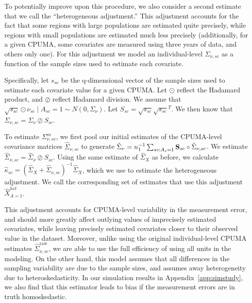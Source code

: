 To potentially improve upon this procedure, we also consider a second estimate that we call the ``heterogeneous adjustment.'' This adjustment accounts for the fact that some regions with large populations are estimated quite precisely, while regions with small populations are estimated much less precisely (additionally, for a given CPUMA, some covariates are measured using three years of data, and others only one). For this adjustment we model an individual-level $\Sigma_{\nu, sc}$ as a function of the sample sizes used to estimate each covariate. 

Specifically, let $s_{sc}$ be the q-dimensional vector of the sample sizes used to estimate each covariate value for a given CPUMA. Let $\odot$ reflect the Hadamard product, and $\oslash$ reflect Hadamard division. We assume that $\sqrt{s_{sc}} \odot \nu_{sc} \mid A_{sc} = 1 \sim N(0, \Sigma_{\nu})$. Let $S_{sc} = \sqrt{s_{sc}}\sqrt{s_{sc}}^T$. We then know that $\Sigma_{\nu, sc} = \Sigma_{\nu} \oslash S_{sc}$.

To estimate $\Sigma_{\nu, sc}^m$, we first pool our initial estimates of the CPUMA-level covariance matrices $\hat{\Sigma}_{\nu, sc}$ to generate $\hat{\Sigma}_{\nu} = n_1^{-1}\sum_{sc: A_s = 1} \mathbf{S}_{sc} \circ \hat{\Sigma}_{\nu, sc}$. We estimate $\hat{\Sigma}_{\nu, sc} = \hat{\Sigma}_{\nu} \oslash S_{sc}$. Using the same estimate of $\hat{\Sigma}_X$ as before, we calculate $\hat{\kappa}_{sc} = (\hat{\Sigma}_{X} + \hat{\Sigma}_{\nu, sc})^{-1}\hat{\Sigma}_X$, which we use to estimate the heterogeneous adjustment. We call the corresponding set of estimates that use this adjustment $\hat{X}_{A=1}^{het}$.

This adjustment accounts for CPUMA-level variability in the measurement error, and should more greatly affect outlying values of imprecisely estimated covariates, while leaving precisely estimated covariates closer to their observed value in the dataset. Moreover, unlike using the original individual-level CPUMA estimates $\hat{\Sigma}_{\nu, sc}^{\text{raw}}$, we are able to use the full efficiency of using all units in the modeling. On the other hand, this model assumes that all differences in the sampling variability are due to the sample sizes, and assumes away heterogeneity due to heteroskedasticity. In our simulation results in Appendix~\ref{app:simstudy}, we also find that this estimator leads to bias if the measurement errors are in truth homoskedastic. 

